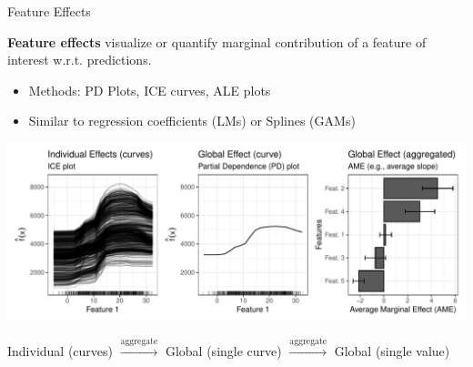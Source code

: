 \documentclass[11pt,compress,t,notes=noshow, aspectratio=169, xcolor=table]{beamer}
\begin{document}
\begin{frame}{Feature Effects}

\textbf{Feature effects} visualize or quantify marginal contribution of a feature of interest w.r.t. predictions. %
\begin{itemize}
\item Methods: PD Plots, ICE curves, ALE plots
\item Similar to regression coefficients (LMs) or Splines (GAMs)
\end{itemize}

\centerline{\includegraphics[width=\textwidth]{figure/feature-effect.pdf}}

\centerline{\small \hspace{20px} Individual (curves) \hspace{8px}
$\xrightarrow[]{\text{aggregate}}$ \hspace{8px} Global (single curve) \hspace{8px}
$\xrightarrow[]{\text{aggregate}}$ \hspace{8px} Global (single value)}


\end{frame}


\endlecture
\end{document}
